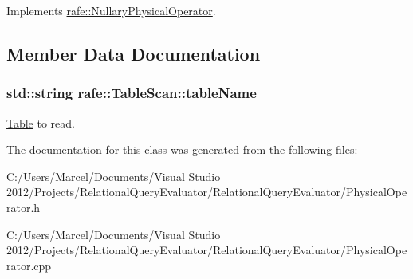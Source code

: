 Implements \hyperlink{classrafe_1_1_nullary_physical_operator_a0810fc4b368521ebe847fa48fcdcf948}{rafe\+::\+Nullary\+Physical\+Operator}.



\subsection{Member Data Documentation}
\hypertarget{classrafe_1_1_table_scan_a594b9df476c4abc0e74cc9ded1101978}{
\subsubsection[{table\+Name}]{\setlength{\rightskip}{0pt plus 5cm}std\+::string rafe\+::\+Table\+Scan\+::table\+Name}}\label{classrafe_1_1_table_scan_a594b9df476c4abc0e74cc9ded1101978}
\hyperlink{classrafe_1_1_table}{Table} to read. 

The documentation for this class was generated from the following files\+:\begin{DoxyCompactItemize}
\item 
C\+:/\+Users/\+Marcel/\+Documents/\+Visual Studio 2012/\+Projects/\+Relational\+Query\+Evaluator/\+Relational\+Query\+Evaluator/Physical\+Operator.\+h\item 
C\+:/\+Users/\+Marcel/\+Documents/\+Visual Studio 2012/\+Projects/\+Relational\+Query\+Evaluator/\+Relational\+Query\+Evaluator/Physical\+Operator.\+cpp\end{DoxyCompactItemize}
